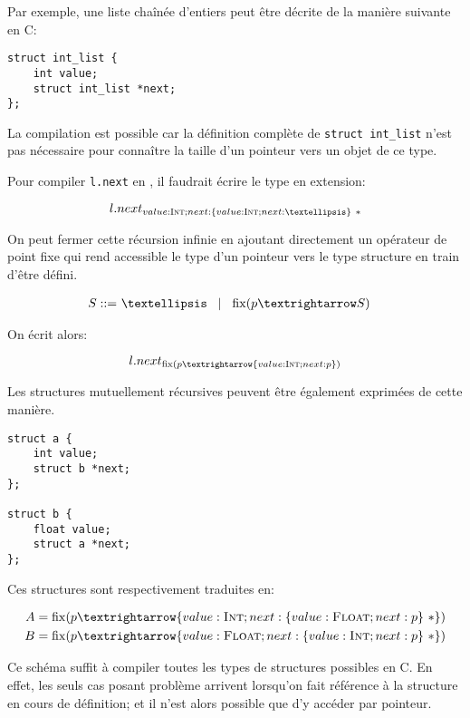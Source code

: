 
Par exemple, une liste chaînée d'entiers peut être décrite de la manière
suivante en C:\@

\begin{verbatim}
struct int_list {
    int value;
    struct int_list *next;
};
\end{verbatim}


La compilation est possible car la définition complète de \texttt{struct
int\_list} n'est pas nécessaire pour connaître la taille d'un pointeur vers un
objet de ce type.

Pour compiler \texttt{l.next} en \langname, il faudrait écrire le type en
extension:

\[
  l.next_{ value:\tInt ; next : \{ value : \tInt ; next : … \}~*}
\]

On peut fermer cette récursion infinie en ajoutant directement un opérateur de
point fixe qui rend accessible le type d'un pointeur vers le type structure en
train d'être défini.

\begin{align*}
    S \gramisa & … \gramorx \mathrm{fix}(p → S)
\end{align*}

On écrit alors:

\[
  l.next_{ \mathrm{fix}(p → \{ value : \tInt ; next : p \}) }
\]

Les structures mutuellement récursives peuvent être également exprimées de cette
manière.

\begin{verbatim}
struct a {
    int value;
    struct b *next;
};

struct b {
    float value;
    struct a *next;
};
\end{verbatim}

Ces structures sont respectivement traduites en:

\begin{align*}
  A &= \mathrm{fix} (p → \{ value : \tInt   ; next : \{ value : \tFloat ; next : p \}~* \}) \\
  B &= \mathrm{fix} (p → \{ value : \tFloat ; next : \{ value : \tInt   ; next : p \}~* \})
\end{align*}

Ce schéma suffit à compiler toutes les types de structures possibles en C. En
effet, les seuls cas posant problème arrivent lorsqu'on fait référence à la
structure en cours de définition; et il n'est alors possible que d'y accéder
par pointeur.

